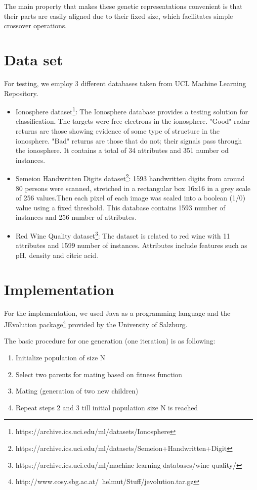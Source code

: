 \documentclass[11pt,onecolumn,a4paper]{article}
\begin{document}
  The main property that makes these genetic representations convenient is that their parts are easily aligned due to their fixed size, which facilitates simple crossover operations.
\section{Data set}
\label{sec:eval}
For testing, we employ 3 different databases taken from UCL Machine Learning Repository. 

\begin{itemize}
	\item Ionosphere dataset\footnote{https://archive.ics.uci.edu/ml/datasets/Ionosphere}: The Ionosphere database  provides a testing solution for classification.  The targets were free electrons in the ionosphere. "Good" radar returns are those showing evidence of some type of structure in the ionosphere. "Bad" returns are those that do not; their signals pass through the ionosphere. It contains a total of 34 attributes and 351 number od instances. 
	
	\item Semeion Handwritten Digits dataset\footnote{https://archive.ics.uci.edu/ml/datasets/Semeion+Handwritten+Digit}: 1593 handwritten digits from around 80 persons were scanned, stretched in a rectangular box 16x16 in a grey scale of 256 values.Then each pixel of each image was scaled into a boolean (1/0) value using a fixed threshold. This database contains 1593 number of instances and 256 number of attributes.
	\item Red Wine Quality dataset\footnote{https://archive.ics.uci.edu/ml/machine-learning-databases/wine-quality/}: The dataset is related to red wine with 11 attributes and 1599 number of instances. Attributes include features such as pH, density and citric acid.
\end{itemize}



\section{Implementation}
\label{sec:eval}

For the implementation, we used Java as a programming language and the JEvolution package\footnote{http://www.cosy.sbg.ac.at/~helmut/Stuff/jevolution.tar.gz} provided by the University of Salzburg.

The basic procedure for one generation (one iteration) is as following:

\begin{enumerate}
\item {Initialize population of size N}
\item {Select two parents for mating based on fitness function}
\item {Mating (generation of two new children)}
\item{Repeat steps 2 and 3 till initial population size N is reached}
\end{enumerate}   
\end{document}
